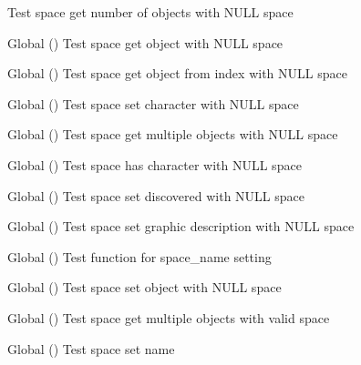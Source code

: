 \begin{DoxyRefList}
Test space get number of objects with NULL space  
\item[Global \doxylink{space__test_8h_a0fe857c34f691aaba197d03315c3955f}{test2\+\_\+space\+\_\+get\+\_\+object} ()]\label{test__test000182}%
%
Test space get object with NULL space  
\item[Global \doxylink{space__test_8c_a68376dad775343380755a49fc53bc8ad}{test2\+\_\+space\+\_\+get\+\_\+object\+\_\+from\+\_\+index} ()]\label{test__test000195}%
%
Test space get object from index with NULL space  
\item[Global \doxylink{space__test_8c_a1cbe7dcf6e64da12172acc79abbd3f65}{test2\+\_\+space\+\_\+has\+\_\+character} ()]\label{test__test000201}%
%
Test space set character with NULL space  
\item[Global \doxylink{space__test_8c_a4c5deb606df6b7b0bd886069628a35e4}{test2\+\_\+space\+\_\+multiple\+\_\+objects} ()]\label{test__test000184}%
%
Test space get multiple objects with NULL space  
\item[Global \doxylink{space__test_8c_a15f055b2abf4bb7588c3ec4f926e269f}{test2\+\_\+space\+\_\+remove\+\_\+character} ()]\label{test__test000203}%
%
Test space has character with NULL space  
\item[Global \doxylink{space__test_8c_a997b53a481b02485dd54c9cbce83465a}{test2\+\_\+space\+\_\+set\+\_\+discovered} ()]\label{test__test000189}%
%
Test space set discovered with NULL space  
\item[Global \doxylink{space__test_8c_af40c7a664b529a39c3d98dca3d0af708}{test2\+\_\+space\+\_\+set\+\_\+gdesc} ()]\label{test__test000187}%
%
Test space set graphic description with NULL space  
\item[Global \doxylink{space__test_8c_a5a868ba017602ba6b58447cb394e81a6}{test2\+\_\+space\+\_\+set\+\_\+name} ()]\label{test__test000173}%
%
Test function for space\+\_\+name setting  
\item[Global \doxylink{space__test_8c_a6349e2b547c71dee23b96d8bbf7a1806}{test2\+\_\+space\+\_\+set\+\_\+object} ()]\label{test__test000176}%
%
Test space set object with NULL space  
\item[Global \doxylink{space__test_8c_a3fb76d2dce3ed1a0ce85228e2f7d1cab}{test3\+\_\+space\+\_\+multiple\+\_\+objects} ()]\label{test__test000185}%
%
Test space get multiple objects with valid space  
\item[Global \doxylink{space__test_8c_aa24a337830006e33706ab6ac1c416b47}{test3\+\_\+space\+\_\+set\+\_\+name} ()]\label{test__test000174}%
%
Test space set name 
\end{DoxyRefList}